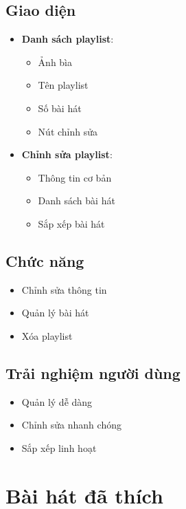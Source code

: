 \documentclass{article}
\begin{document}
\subsection{Giao diện}
\begin{itemize}
    \item \textbf{Danh sách playlist}:
    \begin{itemize}
        \item Ảnh bìa
        \item Tên playlist
        \item Số bài hát
        \item Nút chỉnh sửa
    \end{itemize}
    \item \textbf{Chỉnh sửa playlist}:
    \begin{itemize}
        \item Thông tin cơ bản
        \item Danh sách bài hát
        \item Sắp xếp bài hát
    \end{itemize}
\end{itemize}

\subsection{Chức năng}
\begin{itemize}
    \item Chỉnh sửa thông tin
    \item Quản lý bài hát
    \item Xóa playlist
\end{itemize}

\subsection{Trải nghiệm người dùng}
\begin{itemize}
    \item Quản lý dễ dàng
    \item Chỉnh sửa nhanh chóng
    \item Sắp xếp linh hoạt
\end{itemize}

\section{Bài hát đã thích}
\end{document}
